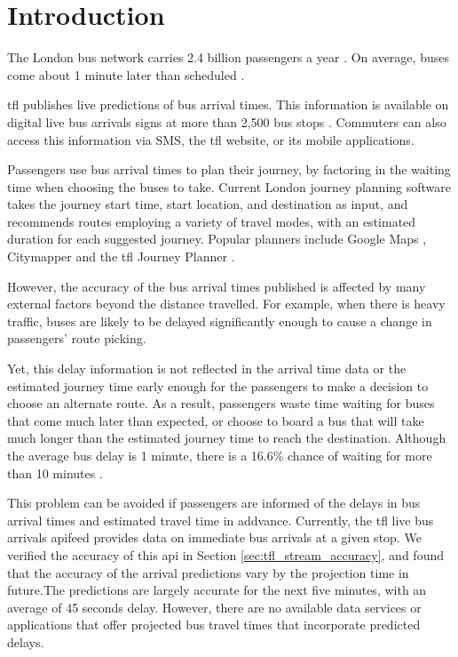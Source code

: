 \chapter{Introduction}

\par The London bus network carries 2.4 billion passengers a year \cite{tfl_annual_report_13/14}. On average, buses come about 1 minute later than scheduled \cite{buses_performance_report}.

\par \acrfull{tfl} publishes live predictions of bus arrival times. This information is available on digital live bus arrivals signs at more than 2,500 bus stops \cite{live_bus_arrivals}. Commuters can also access this information via SMS, the \acrshort{tfl} website, or its mobile applications.

\par Passengers use bus arrival times to plan their journey, by factoring in the waiting time when choosing the buses to take. Current London journey planning software takes the journey start time, start location, and destination as input, and recommends routes employing a variety of travel modes, with an estimated duration for each suggested journey. Popular planners include Google Maps \cite{google_maps}, Citymapper \cite{citymapper} and the \acrshort{tfl} Journey Planner \cite{tfl_journey_planner}.
\par However, the accuracy of the bus arrival times published is affected by many external factors beyond the distance travelled. For example, when there is heavy traffic, buses are likely to be delayed significantly enough to cause a change in passengers' route picking.

\par Yet, this delay information is not reflected in the arrival time data or the estimated journey time early enough for the passengers to make a decision to choose an alternate route. As a result, passengers waste time waiting for buses that come much later than expected, or choose to board a bus that will take much longer than the estimated journey time to reach the destination. Although the average bus delay is 1 minute, there is a 16.6\% chance of waiting for more than 10 minutes \cite{buses_performance_data}.

\par This problem can be avoided if passengers are informed of the delays in bus arrival times and estimated travel time in addvance. Currently, the \acrshort{tfl} live bus arrivals \acrfull{api}feed\cite{live_bus_arrivals} provides data on immediate bus arrivals at a given stop. We verified the accuracy of this \acrshort{api} in Section \ref{sec:tfl_stream_accuracy}, and found that the accuracy of the arrival predictions vary by the projection time in future.The predictions are largely accurate for the next five minutes, with an average of 45 seconds delay. However, there are no available data services or applications that offer projected bus travel times that incorporate predicted delays.

